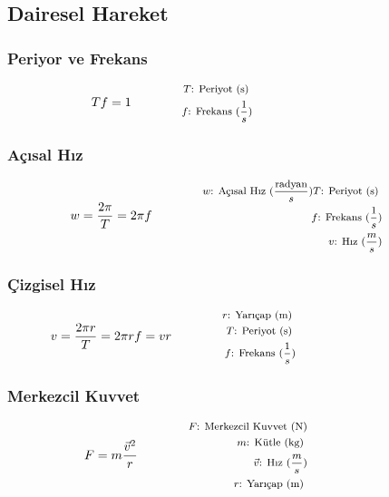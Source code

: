 \subsection{Dairesel Hareket}

\subsubsection*{Periyor ve Frekans}
\begin{equation}
    Tf = 1 \qquad \qquad \parbox{5.5cm}{\footnotesize$\begin{aligned}
        T\text{: Periyot (s) } \\
        f\text{: Frekans } (\frac{1}{s})
\end{aligned}$}
\end{equation}

\subsubsection*{Açısal Hız}
\begin{equation}
    w  = \frac{2\pi}{T} = 2 \pi f \qquad \qquad \parbox{5.5cm}{\footnotesize$\begin{aligned}
        w\text{: Açısal Hız } (\frac{\text{radyan}}{s})
        T\text{: Periyot (s) } \\
        f\text{: Frekans } (\frac{1}{s}) \\
        v\text{: Hız } (\frac{m}{s})
\end{aligned}$}
\end{equation}

\subsubsection*{Çizgisel Hız}
\begin{equation}
    v = \frac{2 \pi r}{T} = 2 \pi r f = v r  \qquad \qquad \parbox{5.5cm}{\footnotesize$\begin{aligned}
        r\text{: Yarıçap (m) } \\
        T\text{: Periyot (s) } \\
        f\text{: Frekans } (\frac{1}{s})
\end{aligned}$}
\end{equation}

\subsubsection*{Merkezcil Kuvvet}
\begin{equation}
    F = m \frac{\vec{v}^2}{r} \qquad \qquad \parbox{5.5cm}{\footnotesize$\begin{aligned}
        F\text{: Merkezcil Kuvvet (N)} \\
        m\text{: Kütle (kg) } \\
        \vec{v}\text{: Hız } (\frac{m}{s}) \\
        r\text{: Yarıçap (m) }
\end{aligned}$}
\end{equation}

